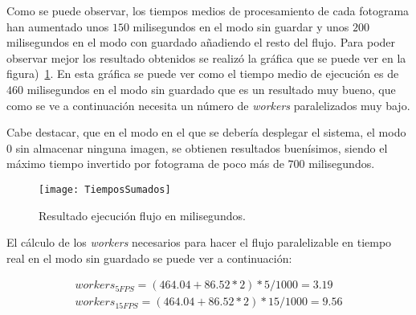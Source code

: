 {\begin{table}[h]
	\centering
	\caption{Tabla con los resultados de la ejecución del flujo en milisegundos.}
	\label{tab:res2}
\end{table}

Como se puede observar, los tiempos medios de procesamiento de cada fotograma han aumentado unos $150$ milisegundos en el modo sin guardar y unos $200$ milisegundos en el modo con guardado añadiendo el resto del flujo. Para poder observar mejor los resultado obtenidos se realizó la gráfica que se puede ver en la figura)~\ref{fig:res2}. En esta gráfica se puede ver como el tiempo medio de ejecución es de $460$ milisegundos en el modo sin guardado que es un resultado muy bueno, que como se ve a continuación necesita un número de \textit{workers} paralelizados muy bajo.

Cabe destacar, que en el modo en el que se debería desplegar el sistema, el modo 0 sin almacenar ninguna imagen, se obtienen resultados buenísimos, siendo el máximo tiempo invertido por fotograma de poco más de $700$ milisegundos.

\begin{figure}[h]
	\centering
	\texttt{[image: TiemposSumados]}
	\caption{Resultado ejecución flujo en milisegundos.}
	\label{fig:res2}
\end{figure}

El cálculo de los \textit{workers} necesarios para hacer el flujo paralelizable en tiempo real en el modo sin guardado se puede ver a continuación:

\begin{equation}
\begin{split}
workers_{5FPS} = (464.04 + 86.52*2)*5/1000 = 3.19\\
workers_{15FPS} = (464.04 + 86.52*2)*15/1000 = 9.56
\end{split}
\end{equation}

}
